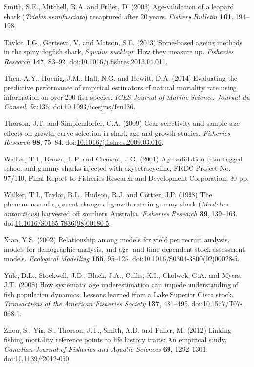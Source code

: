 \documentclass[]{article}
\begin{document}
\hypertarget{ref-smith_age-validation_2003}{}
Smith, S.E., Mitchell, R.A. and Fuller, D. (2003) Age-validation of a
leopard shark (\emph{Triakis semifasciata}) recaptured after 20 years.
\emph{Fishery Bulletin} \textbf{101}, 194--198.

\hypertarget{ref-taylor_spine-based_2013}{}
Taylor, I.G., Gertseva, V. and Matson, S.E. (2013) Spine-based ageing
methods in the spiny dogfish shark, \emph{Squalus suckleyi}: How they
measure up. \emph{Fisheries Research} \textbf{147}, 83--92.
doi:\href{https://doi.org/10.1016/j.fishres.2013.04.011}{10.1016/j.fishres.2013.04.011}.

\hypertarget{ref-then_evaluating_2014}{}
Then, A.Y., Hoenig, J.M., Hall, N.G. and Hewitt, D.A. (2014) Evaluating
the predictive performance of empirical estimators of natural mortality
rate using information on over 200 fish species. \emph{ICES Journal of
Marine Science: Journal du Conseil}, fsu136.
doi:\href{https://doi.org/10.1093/icesjms/fsu136}{10.1093/icesjms/fsu136}.

\hypertarget{ref-thorson_gear_2009}{}
Thorson, J.T. and Simpfendorfer, C.A. (2009) Gear selectivity and sample
size effects on growth curve selection in shark age and growth studies.
\emph{Fisheries Research} \textbf{98}, 75--84.
doi:\href{https://doi.org/10.1016/j.fishres.2009.03.016}{10.1016/j.fishres.2009.03.016}.

\hypertarget{ref-walker_age_2001}{}
Walker, T.I., Brown, L.P. and Clement, J.G. (2001) Age validation from
tagged school and gummy sharks injected with oxytetracycline, FRDC
Project No. 97/110, Final Report to Fisheries Research and Development
Corporation. 30 pp.

\hypertarget{ref-walker_phenomenon_1998}{}
Walker, T.I., Taylor, B.L., Hudson, R.J. and Cottier, J.P. (1998) The
phenomenon of apparent change of growth rate in gummy shark
(\emph{Mustelus antarcticus}) harvested off southern Australia.
\emph{Fisheries Research} \textbf{39}, 139--163.
doi:\href{https://doi.org/10.1016/S0165-7836(98)00180-5}{10.1016/S0165-7836(98)00180-5}.

\hypertarget{ref-xiao_relationship_2002}{}
Xiao, Y.S. (2002) Relationship among models for yield per recruit
analysis, models for demographic analysis, and age- and time-dependent
stock assessment models. \emph{Ecological Modelling} \textbf{155},
95--125.
doi:\href{https://doi.org/10.1016/S0304-3800(02)00028-5}{10.1016/S0304-3800(02)00028-5}.

\hypertarget{ref-yule_how_2008}{}
Yule, D.L., Stockwell, J.D., Black, J.A., Cullis, K.I., Cholwek, G.A.
and Myers, J.T. (2008) How systematic age underestimation can impede
understanding of fish population dynamics: Lessons learned from a Lake
Superior Cisco stock. \emph{Transactions of the American Fisheries
Society} \textbf{137}, 481--495.
doi:\href{https://doi.org/10.1577/T07-068.1}{10.1577/T07-068.1}.

\hypertarget{ref-zhou_linking_2012}{}
Zhou, S., Yin, S., Thorson, J.T., Smith, A.D. and Fuller, M. (2012)
Linking fishing mortality reference points to life history traits: An
empirical study. \emph{Canadian Journal of Fisheries and Aquatic
Sciences} \textbf{69}, 1292--1301.
doi:\href{https://doi.org/10.1139/f2012-060}{10.1139/f2012-060}.
\end{document}
